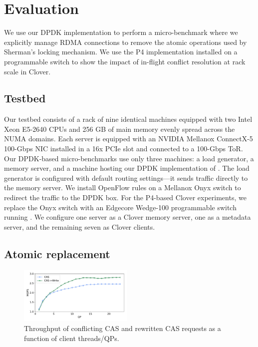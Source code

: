 \section{Evaluation}
\label{s:results}

We use our
DPDK implementation to perform a micro-benchmark where we
explicitly manage RDMA connections to remove the atomic operations
used by Sherman's locking mechanism.  We use the P4 implementation installed on a programmable switch to show the impact of
in-flight conflict resolution at rack scale in Clover.


\subsection{Testbed} 

Our testbed consists of a rack of nine identical machines equipped
with two Intel Xeon E5-2640 CPUs and 256 GB of main memory evenly
spread across the NUMA domains. Each server is equipped with an
NVIDIA Mellanox ConnectX-5 100-Gbps NIC installed in a 16x PCIe slot and connected to a 100-Gbps ToR.  Our DPDK-based
micro-benchmarks use only three machines: a load generator, a memory
server, and a machine hosting our DPDK implementation of {\sword}.
The load generator is configured with default routing settings---it
sends traffic directly to the memory server.  We install OpenFlow
rules on a Mellanox Onyx switch to redirect the traffic to the DPDK
box.  For the P4-based Clover experiments, we replace the Onyx switch
with an Edgecore Wedge-100 programmable switch running \sword.
We configure one server as a Clover memory server, one as a metadata
server, and the remaining seven as Clover clients.

\subsection{Atomic replacement}

\begin{figure}[t]
    \includegraphics[width=0.485\textwidth]{fig/cas_vs_swap.pdf}
    \caption{Throughput of conflicting CAS and rewritten CAS requests as a function of client threads/QPs.}
    \label{fig:cas_vs_swap}
\end{figure}


